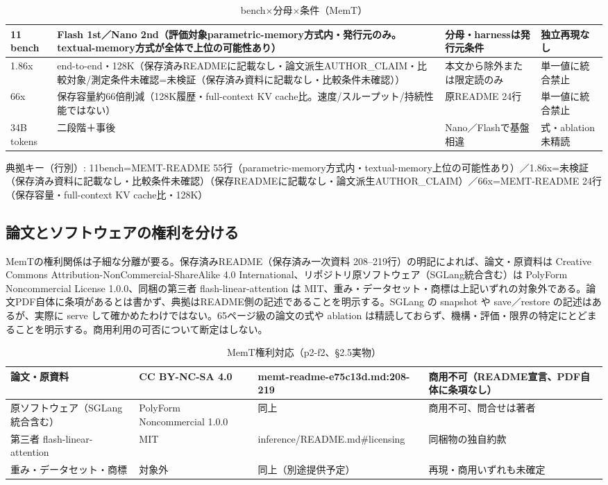 \documentclass[lualatex,a4paper,10pt]{jlreq}
\begin{document}
\begin{table}[htbp]\centering\footnotesize
\caption{bench×分母×条件（MemT）}
\begin{tabularx}{0.96\linewidth}{@{}lXXX@{}}
\toprule
11 bench & Flash 1st／Nano 2nd（評価対象parametric-memory方式内・発行元のみ。textual-memory方式が全体で上位の可能性あり） & 分母・harnessは発行元条件 & 独立再現なし \\
\midrule
1.86x & end-to-end・128K（保存済みREADMEに記載なし・論文派生AUTHOR\_CLAIM・比較対象/測定条件未確認=未検証（保存済み資料に記載なし・比較条件未確認）） & 本文から除外または限定読のみ & 単一値に統合禁止 \\
66x & 保存容量約66倍削減（128K履歴・full-context KV cache比。速度/スループット/持続性能ではない） & 原README 24行 & 単一値に統合禁止 \\
34B tokens & 二段階＋事後 & Nano／Flashで基盤相違 & 式・ablation未精読 \\
\bottomrule
\end{tabularx}
{\scriptsize\color{SurveyMuted} 典拠キー（行別）: 11bench=MEMT-README 55行（parametric-memory方式内・textual-memory上位の可能性あり）／1.86x=未検証（保存済み資料に記載なし・比較条件未確認）（保存READMEに記載なし・論文派生AUTHOR\_CLAIM）／66x=MEMT-README 24行（保存容量・full-context KV cache比・128K）\par}
\end{table}


\subsection*{論文とソフトウェアの権利を分ける}


MemTの権利関係は子細な分離が要る。保存済みREADME（保存済み一次資料 208–219行）の明記によれば、論文・原資料は Creative Commons Attribution-NonCommercial-ShareAlike 4.0 International、リポジトリ原ソフトウェア（SGLang統合含む）は PolyForm Noncommercial License 1.0.0、同梱の第三者 flash-linear-attention は MIT、重み・データセット・商標は上記いずれの対象外である。論文PDF自体に条項があるとは書かず、典拠はREADME側の記述であることを明示する。SGLang の snapshot や save／restore の記述はあるが、実際に serve して確かめたわけではない。65ページ級の論文の式や ablation は精読しておらず、機構・評価・限界の特定にとどまることを明示する。商用利用の可否について断定はしない。


\begin{table}[htbp]\centering\footnotesize
\caption{MemT権利対応（p2-f2、§2.5実物）}
\begin{tabularx}{0.96\linewidth}{@{}lXXX@{}}
\toprule
論文・原資料 & CC BY-NC-SA 4.0 & memt-readme-e75c13d.md:208-219 & 商用不可（README宣言、PDF自体に条項なし） \\
\midrule
原ソフトウェア（SGLang統合含む） & PolyForm Noncommercial 1.0.0 & 同上 & 商用不可、問合せは著者 \\
第三者 flash-linear-attention & MIT & inference/README.md\#licensing & 同梱物の独自約款 \\
重み・データセット・商標 & 対象外 & 同上（別途提供予定） & 再現・商用いずれも未確定 \\
\bottomrule
\end{tabularx}
\end{table}
\end{document}
